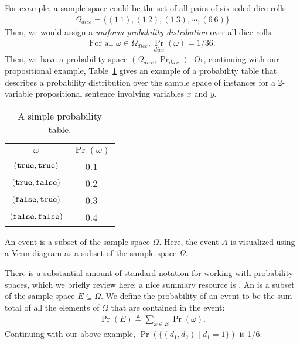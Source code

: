 \documentclass{tufte-handout}
\begin{document}
For example, a sample space could be the set of all pairs of six-sided dice rolls:
\begin{align*}
    \Omega_{dice} = \{ (1~1), (1~2), (1~3), \cdots, (6~6)\}
\end{align*}
Then, we would assign a \emph{uniform probability distribution} over all dice
rolls:
\begin{align*}
    \text{For all } \omega \in \Omega_{dice}, \Pr_{dice}(\omega) = 1/36.
\end{align*}
Then, we have a probability space $(\Omega_{dice}, \Pr_{dice})$.
Or, continuing with our propositional example,
Table~\ref{tbl:simple} gives an example of a probability table that describes a
probability distribution over the sample space of instances for a 2-variable
propositional sentence involving variables $x$ and $y$.

\begin{table}
    \centering
 \begin{tabular}{c||c}
    \toprule
    $\omega$ & $\Pr(\omega)$ \\
    \midrule 
    $(\texttt{true}, \texttt{true})$ & 0.1 \\ 
    $(\texttt{true}, \texttt{false})$ & 0.2 \\ 
    $(\texttt{false}, \texttt{true})$ & 0.3 \\ 
    $(\texttt{false}, \texttt{false})$ & 0.4 \\ 
    \bottomrule
\end{tabular}
\caption{A simple probability table.}
\label{tbl:simple}
\end{table}

\begin{marginfigure}
        \caption{An event is a subset of the sample space $\Omega$. Here, the event $A$ 
        is visualized using a Venn-diagram as a subset of the sample space $\Omega$.}
\end{marginfigure}

There is a substantial amount of standard notation for working with probability spaces, 
which we briefly review here; a nice summary resource is \citet[Chapter 3]{darwiche2009modeling}.
An  is a subset of the sample space $E \subseteq \Omega$. We define
the probability of an event to be the sum total of all the elements of $\Omega$ that 
are contained in the event:
\begin{align}
    \Pr(E) \triangleq \sum_{\omega \in E} \Pr(\omega).
\end{align}
Continuing with our above example, $\Pr(\{(d_1, d_2) \mid d_1 = 1\})$ is 1/6.
\end{document}
